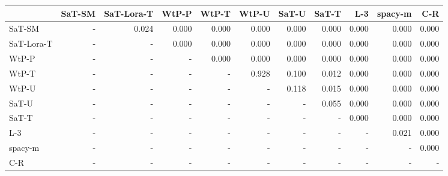 \begin{tabular}{lrrrrrrrrrr}
\toprule
 & SaT-SM & SaT-Lora-T & WtP-P & WtP-T & WtP-U & SaT-U & SaT-T & L-3 & spacy-m & C-R \\
\midrule
SaT-SM & - & 0.024 & 0.000 & 0.000 & 0.000 & 0.000 & 0.000 & 0.000 & 0.000 & 0.000 \\
SaT-Lora-T & - & - & 0.000 & 0.000 & 0.000 & 0.000 & 0.000 & 0.000 & 0.000 & 0.000 \\
WtP-P & - & - & - & 0.000 & 0.000 & 0.000 & 0.000 & 0.000 & 0.000 & 0.000 \\
WtP-T & - & - & - & - & 0.928 & 0.100 & 0.012 & 0.000 & 0.000 & 0.000 \\
WtP-U & - & - & - & - & - & 0.118 & 0.015 & 0.000 & 0.000 & 0.000 \\
SaT-U & - & - & - & - & - & - & 0.055 & 0.000 & 0.000 & 0.000 \\
SaT-T & - & - & - & - & - & - & - & 0.000 & 0.000 & 0.000 \\
L-3 & - & - & - & - & - & - & - & - & 0.021 & 0.000 \\
spacy-m & - & - & - & - & - & - & - & - & - & 0.000 \\
C-R & - & - & - & - & - & - & - & - & - & - \\
\bottomrule
\end{tabular}

